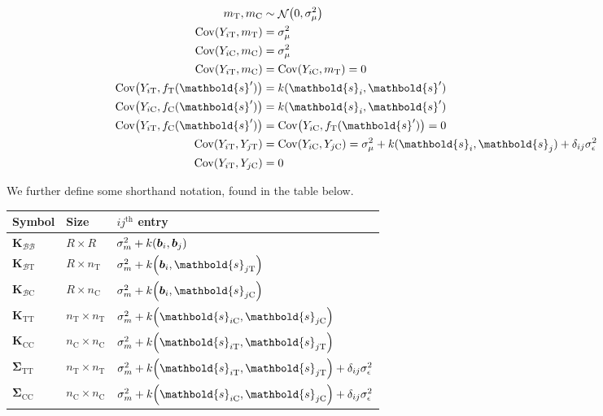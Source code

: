 \documentclass[letter]{article}
\DeclarePairedDelimiter{\parenthesis}{\lparen}{\rparen}
\newcommand{\del}[1]{\parenthesis*{#1}}
\DeclareMathOperator{\cov}{{Cov}}
\DeclareMathOperator{\normal}{\mathcal{N}}
\newcommand{\treat}{\mathrm{T}}
\newcommand{\ctrol}{\mathrm{C}}
\newcommand{\sigman}{\sigma_{\epsilon}}
\newcommand{\sigmamu}{\sigma_{\mu}}
\newcommand{\svec}{\mathbold{s}}
\newcommand{\border}{\mathcal{B}}
\newcommand{\sentinel}{\bm{b}}
\newcommand{\numsent}{R}
\newcommand{\eqlabel}[1]{\label{#1}}
\newcommand{\Kmat}{\mathbold{K}}
\newcommand{\SigmaMat}{\mathbold{\Sigma}}
\newcommand{\KBB}{\Kmat_{\border \border}}
\newcommand{\KBT}{\Kmat_{\border \treat}}
\newcommand{\KBC}{\Kmat_{\border \ctrol}}
\newcommand{\STT}{\SigmaMat_{\treat \treat}}
\newcommand{\SCC}{\SigmaMat_{\ctrol \ctrol}}
\newcommand{\KTT}{\Kmat_{\treat \treat}}
\newcommand{\KCC}{\Kmat_{\ctrol \ctrol}}
\begin{document}
    	\begin{equation}
\begin{split}
    m_\treat, m_\ctrol   &\sim \normal\del{0,\sigmamu^2} \\
    \cov(Y_{i\treat},m_\treat)  &= \sigmamu^2 \\
    \cov(Y_{i\ctrol},m_\ctrol)  &= \sigmamu^2 \\
    \cov(Y_{i\treat},m_\ctrol)  &= \cov(Y_{i\ctrol},m_\treat)  = 0 \\
    \cov\del{Y_{i\treat}, f_{\treat}(\svec')} &= k(\svec_i,\svec') \\
    \cov\del{Y_{i\ctrol}, f_{\ctrol}(\svec')} &= k(\svec_i,\svec') \\
    \cov\del{Y_{i\treat}, f_{\ctrol}(\svec')} &= \cov\del{Y_{i\ctrol}, f_{\treat}(\svec')} = 0 \\
    \cov(Y_{i\treat},Y_{j\treat}) &= \cov(Y_{i\ctrol},Y_{j\ctrol}) = \sigmamu^2 + k(\svec_i,\svec_j) + \delta_{ij}\sigman^2 \\
    \cov(Y_{i\treat},Y_{j\ctrol}) &= 0
\end{split}
\eqlabel{eq:covariances}
\end{equation}
    


    	We further define some shorthand notation, found in the table below.

\begin{center}
\begin{tabular}{lll}
\hline
Symbol & Size                       & $ij^{\mathrm{th}}$ entry                                                      \\ \hline
$\KBB$ & $\numsent \times \numsent$ & $\sigma_m^2 + k\del{\sentinel_i,\sentinel_j}$                                 \\ 
$\KBT$ & $\numsent \times n_\treat$ & $\sigma_m^2 + k\del{\sentinel_i,\svec_{j\treat}}$                             \\ 
$\KBC$ & $\numsent \times n_\ctrol$ & $\sigma_m^2 + k\del{\sentinel_i,\svec_{j\ctrol}}$                             \\
$\KTT$ & $n_\treat \times n_\treat$ & $\sigma_m^2 + k\del{\svec_{i\ctrol},\svec_{j\ctrol}}$                         \\
$\KCC$ & $n_\ctrol \times n_\ctrol$ & $\sigma_m^2 + k\del{\svec_{i\treat},\svec_{j\treat}}$                         \\ 
$\STT$ & $n_\treat \times n_\treat$ & $\sigma_m^2 + k\del{\svec_{i\treat},\svec_{j\treat}} + \delta_{ij} \sigman^2$ \\ 
$\SCC$ & $n_\ctrol \times n_\ctrol$ & $\sigma_m^2 + k\del{\svec_{i\ctrol},\svec_{j\ctrol}} + \delta_{ij} \sigman^2$ \\
\hline
\end{tabular}
\end{center}
\end{document}
